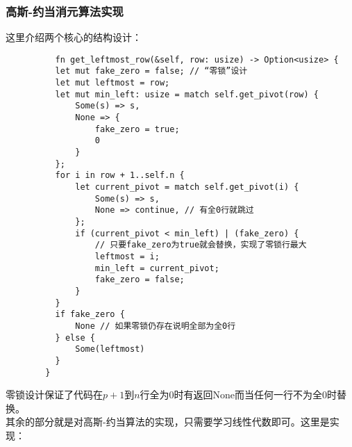 \documentclass[1pt]{article}
\begin{document}
      \subsubsection{高斯-约当消元算法实现}
        这里介绍两个核心的结构设计：
        \begin{lstlisting}
          fn get_leftmost_row(&self, row: usize) -> Option<usize> {
          let mut fake_zero = false; // “零锁”设计
          let mut leftmost = row;
          let mut min_left: usize = match self.get_pivot(row) {
              Some(s) => s,
              None => {
                  fake_zero = true;
                  0
              }
          };
          for i in row + 1..self.n {
              let current_pivot = match self.get_pivot(i) {
                  Some(s) => s,
                  None => continue, // 有全0行就跳过
              };
              if (current_pivot < min_left) | (fake_zero) {
                  // 只要fake_zero为true就会替换，实现了零锁行最大
                  leftmost = i;
                  min_left = current_pivot;
                  fake_zero = false;
              }
          }
          if fake_zero {
              None // 如果零锁仍存在说明全部为全0行
          } else {
              Some(leftmost)
          }
        }
        \end{lstlisting}
        零锁设计保证了代码在$p+1$到$n$行全为0时有返回None而当任何一行不为全0时替换。\\
        其余的部分就是对高斯-约当算法的实现，只需要学习线性代数即可。这里是实现：\\
\end{document}
